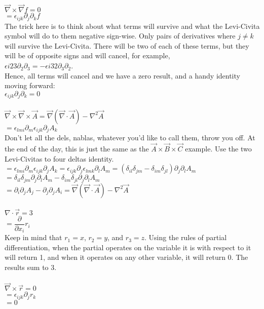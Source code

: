 \documentclass[prb,preprint]
{revtex4-1}
\begin{document}
$\vec{\nabla} \times \vec{\nabla}f = 0$
\\
$= \epsilon_{ijk} \partial_j \partial_k f$
\\
The trick here is to think about what terms will survive and what the Levi-Civita symbol will do to them negative sign-wise.  Only pairs of derivatives where $j \ne k$ will survive the Levi-Civita.  There will be two of each of these terms, but they will be of opposite signs and will cancel, for example,
\\
$\epsilon{i23}\partial_2 \partial_3 = -\epsilon{i32}\partial_3 \partial_2$.
\\
Hence, all terms will cancel and we have a zero result, and a handy identity moving forward:
\\
$\epsilon_{ijk}\partial_j\partial_k = 0$
\\\\
$\vec{\nabla} \times \vec{\nabla} \times \vec{A} = \vec{\nabla}\left(\vec{\nabla} \cdot \vec{A}\right) - \nabla^2 \vec{A}$
\\
$= \epsilon_{lmi} \partial_m \epsilon_{ijk} \partial_j A_k$
\\
Don't let all the dels, nablas, whatever you'd like to call them, throw you off.  At the end of the day, this is just the same as the $\vec{A} \times \vec{B} \times \vec{C}$ example.  Use the two Levi-Civitas to four deltas identity.\\
$= \epsilon_{lmi} \partial_m \epsilon_{ijk} \partial_j A_k = \epsilon_{ijk} \partial_j \epsilon_{lmk} \partial_l A_m  = \left(\delta_{il}\delta_{jm} - \delta_{im}\delta_{jl}\right)\partial_j\partial_l A_m$
\\
$=\delta_{il}\delta_{jm}\partial_j\partial_l A_m - \delta_{im}\delta_{jl}\partial_j\partial_l A_m$
\\
$= \partial_i \partial_j A_j - \partial_j \partial_j A_i = \vec{\nabla}\left(\vec{\nabla}\cdot \vec{A}\right) - \nabla^2 \vec{A}$
\\\\

$\nabla \cdot \vec{r} = 3$\\
$= \dfrac{\partial}{\partial x_i} r_i$\\
Keep in mind that $r_1 = x$, $r_2 = y$, and $r_3 = z$.  Using the rules of partial differentiation, when the partial operates on the variable it is with respect to it will return 1, and when it operates on any other variable, it will return 0.  The results sum to 3.\\\\
$\vec{\nabla} \times \vec{r} = 0$\\
$=\epsilon_{ijk} \partial_j r_k$\\
$= 0$
\end{document}
